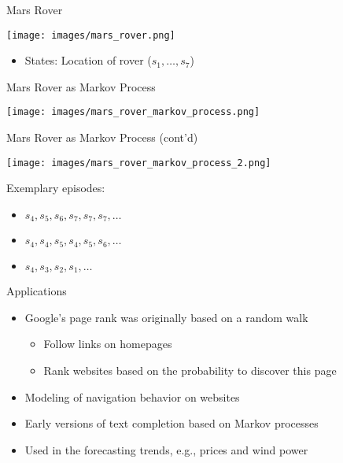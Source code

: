 \documentclass[aspectratio=169]{../latex_main/tntbeamer}  %
\begin{document}
\begin{frame}[c]{Mars Rover}
	
	\centering
	\texttt{[image: images/mars\_rover.png]}
	
	\bigskip
	\begin{itemize}
		\item States: Location of rover ($s_1, \ldots, s_7$)
	\end{itemize}
	
\end{frame}
\begin{frame}[c]{Mars Rover as Markov Process}
	
	\centering
	\texttt{[image: images/mars\_rover\_markov\_process.png]}
	
	
\end{frame}
\begin{frame}[c]{Mars Rover as Markov Process (cont'd)}
	
	\begin{center}
	\texttt{[image: images/mars\_rover\_markov\_process\_2.png]}
	\end{center}
	
	\bigskip
	Exemplary episodes:
	\begin{itemize}
		\item $s_4, s_5, s_6, s_7, s_7, s_7, \ldots$
		\item $s_4, s_4, s_5, s_4, s_5, s_6, \ldots$
		\item $s_4, s_3, s_2, s_1, \ldots$
	\end{itemize}
	
\end{frame}
\begin{frame}[c]{Applications}

	\begin{itemize}
		\item Google's page rank was originally based on a random walk 
		\begin{itemize}
			\item Follow links on homepages
			\item Rank websites based on the probability to discover this page
		\end{itemize}
		\pause
		\smallskip
		\item Modeling of navigation behavior on websites
		\pause
		\medskip
		\item Early versions of text completion based on Markov processes
		\pause
		\medskip
		\item Used in the forecasting trends, e.g., prices and wind power
	\end{itemize}	
	
\end{frame}
\end{document}
